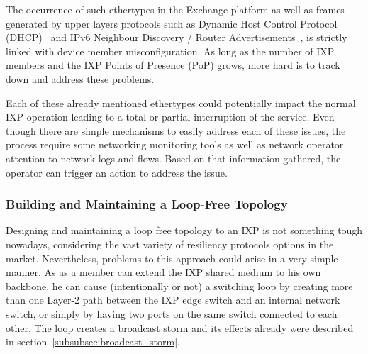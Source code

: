 \documentclass[12pt]{article}
\begin{document}
The occurrence of such ethertypes in the Exchange platform as well as frames generated by upper layers protocols such as Dynamic Host Control Protocol (DHCP)~\cite{rfc2131} and IPv6 Neighbour Discovery / Router Advertisements~\cite{rfc4861}, is strictly linked with device member misconfiguration. As long as the number of IXP members and the IXP Points of Presence (PoP) grows, more hard is to track down and address these problems. 


Each of these already mentioned ethertypes could potentially impact the normal IXP operation leading to a total or partial interruption of the service. Even though there are simple mechanisms to easily address each of these issues, the process require some networking monitoring tools as well as network operator attention to network logs and flows. Based on that information gathered, the operator can trigger an action to address the issue. 

\subsubsection{Building and Maintaining a Loop-Free Topology}


Designing and maintaining a loop free topology to an IXP is not something tough nowadays, considering the vast variety of resiliency protocols options in the market. Nevertheless, problems to this approach could arise in a very simple manner. As as a member can extend the IXP shared medium to his own backbone, he can cause (intentionally or not) a switching loop by creating more than one Layer-2 path between the IXP edge switch and an internal network switch, or simply by having two ports on the same switch connected to each other. The loop creates a broadcast storm and its effects already were described in section~\ref{subsubsec:broadcast_storm}.
\end{document}
